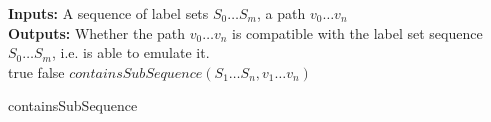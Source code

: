 \begin{algorithm}
\SetAlgoLined
\LinesNumbered
\textbf{Inputs: } A sequence of label sets $S_0 \dots S_m$, a path $v_0 \dots v_n$\\
\textbf{Outputs: } Whether the path $v_0 \dots v_n$ is compatible with the label set sequence $S_0 \dots S_m$, i.e. is able to emulate it.\\
  {
	\Return true\;
}  {
	\Return false\;
}  {
	\Return $\mathit{containsSubSequence}(S_1 \dots S_n, v_1 \dots v_n)$\;
} 
 \caption{containsSubSequence}
 \label{algorithm:containsSubSequence}
\end{algorithm}
